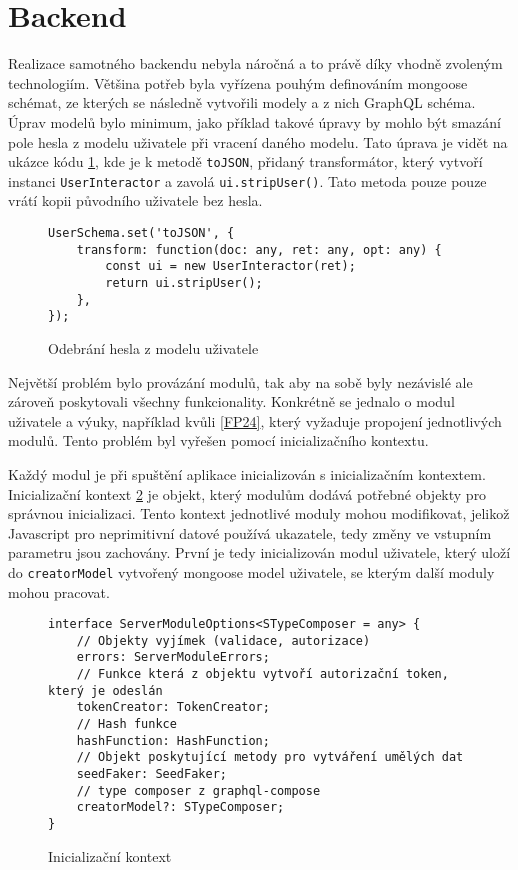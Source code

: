 \section{Backend}
\label{sc:backend}
Realizace samotného backendu nebyla náročná a to právě díky vhodně zvoleným technologiím. Většina potřeb byla vyřízena pouhým definováním mongoose schémat, ze kterých se následně vytvořili modely a z nich GraphQL schéma. Úprav modelů bylo minimum, jako příklad takové úpravy by mohlo být smazání pole hesla z modelu uživatele při vracení daného modelu. Tato úprava je vidět na ukázce kódu \ref{code:to_json_user}, kde je k metodě \texttt{toJSON}, přidaný transformátor, který vytvoří instanci \texttt{UserInteractor} a zavolá \texttt{ui.stripUser()}. Tato metoda pouze pouze vrátí kopii původního uživatele bez hesla.

\begin{figure}[h!]
    \centering
    \begin{verbatim}
UserSchema.set('toJSON', {
    transform: function(doc: any, ret: any, opt: any) {
        const ui = new UserInteractor(ret);
        return ui.stripUser();
    },
});
    \end{verbatim}
    \caption{Odebrání hesla z modelu uživatele}
    \label{code:to_json_user}
\end{figure}

Největší problém bylo provázání modulů, tak aby na sobě byly nezávislé ale zároveň poskytovali všechny funkcionality. Konkrétně se jednalo o modul uživatele a výuky, například kvůli \ref{FP24}, který vyžaduje propojení jednotlivých modulů. Tento problém byl vyřešen pomocí inicializačního kontextu.

Každý modul je při spuštění aplikace inicializován s inicializačním kontextem. Inicializační kontext \ref{code:server_module_options} je objekt, který modulům dodává potřebné objekty pro správnou inicializaci. Tento kontext jednotlivé moduly mohou modifikovat, jelikož Javascript pro neprimitivní datové používá ukazatele, tedy změny ve vstupním parametru jsou zachovány. První je tedy inicializován modul uživatele, který uloží do \texttt{creatorModel} vytvořený mongoose model uživatele, se kterým další moduly mohou pracovat.

\begin{figure}[h!]
    \centering
    \begin{verbatim}
interface ServerModuleOptions<STypeComposer = any> {
    // Objekty vyjímek (validace, autorizace)
    errors: ServerModuleErrors;
    // Funkce která z objektu vytvoří autorizační token, který je odeslán
    tokenCreator: TokenCreator;
    // Hash funkce
    hashFunction: HashFunction; 
    // Objekt poskytující metody pro vytváření umělých dat
    seedFaker: SeedFaker;
    // type composer z graphql-compose
    creatorModel?: STypeComposer; 
}
    \end{verbatim}
    \caption{Inicializační kontext}
    \label{code:server_module_options}
\end{figure}

